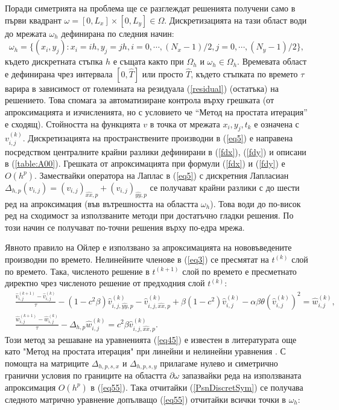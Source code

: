 \documentclass[a4paper]{article}
\newcommand{\rf}[1]{(\ref{#1})}
\theoremstyle{remark}
\begin{document}
Поради симетрията на проблема ще се разглеждат решенията получени само в първи квадрант $\omega = [0,L_x] \times[0,L_y] \in \Omega$. Дискретизацията на тази област води до мрежата $\omega_h$ дефинирана по следния начин:
$$
\omega_h = \{(x_i,y_j): x_i = ih, y_j = jh, i = 0,\cdots ,(N_x-1)/2, j = 0,\cdots , (N_y-1)/2 \},
$$
където дискретната стъпка $h$ е същата както при $\Omega_h$ и $\omega_h \in \Omega_h$. Времевата област е дефинирана чрез интервала $[0, \widehat T]$ или просто $\widehat T$, където стъпката по времето $\tau$ варира в зависимост от големината на резидуала \rf{residual} (остатъка) на решението. Това спомага за автоматизиране контрола върху грешката (от апроксимацията и изчисленията, но с условието че ``Метод на простата итерация'' е сходящ). Стойността на функцията $v$ в точка от мрежата $x_i,y_j,t_k$ е означена с $v_{i,j}^{(k)}$. 
Дискретизацията на пространствените производни в \rf{eq5} е направена посредством централните крайни разлики дефинирани в \rf{fdx}, \rf{fdy} и описани в \rf{table:A00}. Грешката от апроксимацията при формули \rf{fdx} и \rf{fdy} е $O(h^p)$. Замествайки оператора на Лаплас в \rf{eq5} с дискретния Лапласиан $\Delta_{h,p} (v_{i,j}) = (v_{i,j})_{\widehat{xx},p} + (v_{i,j})_{\widehat{yy},p}$ се получават крайни разлики с до шести ред на апроксимация (във вътрешността на областта $\omega_h$). Това води до по-висок ред на сходимост за използваните методи при достатъчно гладки решения. По този начин се получават по-точни решения върху по-едра мрежа. 
\par
Явното правило на Ойлер е използвано за апроксимацията на нововъведените производни по времето. Нелинейните членове в \rf{eq3} се пресмятат на $t^{(k)}$ слой по времето. Така, численото решение в $t^{(k+1)}$ слой по времето е пресметнато директно чрез численото решение от предходния слой $t^{(k)}$:
\begin{equation}\label{eq55}
\begin{split}
&\frac {\widehat{v}_{i,j}^{(k+1)}-\widehat{v}_{i,j}^{(k)}}{\tau}- (1-c^2 \beta) \widehat{v}_{i,j,{\widehat{yy},p}}^{(k)} - \widehat{v}_{i,j,{\widehat{xx},p}}^{(k)} + \beta (1-c^2 ) \widehat{v}_{i,j}^{(k)} - \alpha \beta \theta (\widehat{v}_{i,j}^{(k)})^2 = \widehat{w}_{i,j}^{(k)}, \\
&\frac  {\widehat{w}_{i,j}^{(k+1)} -\widehat{w}_{i,j}^{(k)}} {\tau} - \Delta_{h,p} \widehat{w}_{i,j}^{(k)} =  c^2 \beta \widehat{v}_{i,j,{\widehat{xx},p}}^{(k)}.
\end{split}
\end{equation}
Този метод за решаване на уравненията \rf{eq45} е известен в литературата още като "Метод на простата итерация" при линейни и нелинейни уравнения \cite{sam}. С помощта на матриците $\Delta_{h,p,s,x}$ и $\Delta_{h,p,s,y}$ прилагаме нулево и симетрично гранични условия по границите на областта $\partial \omega$ запазвайки реда на използваната апроксимация $O(h^p)$ в \rf{eq55}. Така отчитайки \rf{PsnDiscretSym} се получава следното матрично уравнение допълващо \rf{eq55} отчитайки всички точки в $\omega_h$:
\end{document}
